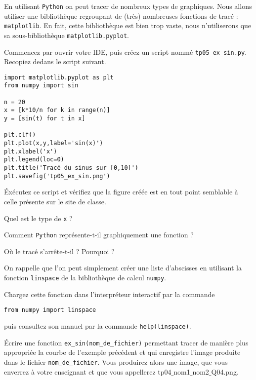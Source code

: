 
En utilisant \texttt{Python}{} on peut tracer de nombreux types de graphiques. 
Nous allons utiliser une bibliothèque regroupant de (très) nombreuses fonctions de tracé : \texttt{matplotlib}.
En fait, cette bibliothèque est bien trop vaste, nous n'utiliserons que sa sous-bibliothèque \texttt{matplotlib.pyplot}.

Commencez par ouvrir votre IDE, puis créez un script nommé \texttt{tp05\_ex\_sin.py}. Recopiez dedans le script suivant. 
\begin{lstlisting}
import matplotlib.pyplot as plt
from numpy import sin

n = 20
x = [k*10/n for k in range(n)]
y = [sin(t) for t in x]

plt.clf()
plt.plot(x,y,label='sin(x)')
plt.xlabel('x')
plt.legend(loc=0)
plt.title('Tracé du sinus sur [0,10]')
plt.savefig('tp05_ex_sin.png')
\end{lstlisting}
\'Exécutez ce script et vérifiez que la figure créée est en tout point semblable à celle présente sur le site de classe. 

\medskip{}

\question{} Quel est le type de \texttt{x} ?

\medskip{}

\question{} Comment \texttt{Python}{} représente-t-il graphiquement une fonction ? 

\medskip{}

\question{} Où le tracé s'arrête-t-il ? Pourquoi ? 

\medskip{}

On rappelle que l'on peut simplement créer une liste d'abscisses en utilisant la fonction \texttt{linspace} de la bibliothèque de calcul \texttt{numpy}. 

Chargez cette fonction dans l'interpréteur interactif par la commande 
\begin{lstlisting}
from numpy import linspace
\end{lstlisting}
puis consultez son manuel par la commande \texttt{help(linspace)}. 

\medskip{}

\question{}\label{tp05:qu:sin2} Écrire une fonction \texttt{ex\_sin(nom\_de\_fichier)} permettant tracer de manière plus appropriée la courbe de l'exemple précédent et qui enregistre l'image produite dans le fichier \texttt{nom\_de\_fichier}. 
Vous produirez alors une image, que vous enverrez à votre enseignant et que vous appellerez tp04$\_$nom1$\_$nom2$\_$Q04.png. 

